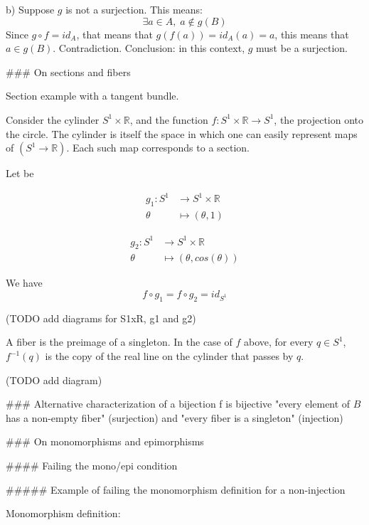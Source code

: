 b) Suppose $g$ is not a surjection. This means:
$$\exists a \in A, \; a \notin g(B)$$
Since $g \circ f = id_A$, that means that $g(f(a)) = id_A(a) = a$, this means that $a \in g(B)$. Contradiction.
Conclusion: in this context, $g$ must be a surjection.



### On sections and fibers

Section example with a tangent bundle.

Consider the cylinder $S^1 \times \mathbb{R}$, and the function $f : S^1 \times \mathbb{R} \to S^1$, the projection onto the circle. The cylinder is itself the space in which one can easily represent maps of $(S^1 \to \mathbb{R})$. Each such map corresponds to a section.

Let be 

$$
\begin{align*}
g_1 : S^1    & \longrightarrow  S^1 \times \mathbb{R} \\
      \theta & \longmapsto      (\theta, 1)
\end{align*}
$$


$$
\begin{align*}
g_2 : S^1    & \longrightarrow  S^1 \times \mathbb{R} \\
      \theta & \longmapsto      (\theta, cos(\theta))
\end{align*}
$$

We have
$$f \circ g_1 = f \circ g_2 = id_{S^1}$$

(TODO add diagrams for S1xR, g1 and g2)

A fiber is the preimage of a singleton. In the case of $f$ above, for every $q \in S^1$, $f^{-1}({q})$ is the copy of the real line on the cylinder that passes by $q$.

(TODO add diagram)






### Alternative characterization of a bijection
f is bijective \Leftrightarrow "every element of $B$ has a non-empty fiber" (surjection) and "every fiber is a singleton" (injection)





### On monomorphisms and epimorphisms

#### Failing the mono/epi condition

##### Example of failing the monomorphism definition for a non-injection 

Monomorphism definition:

